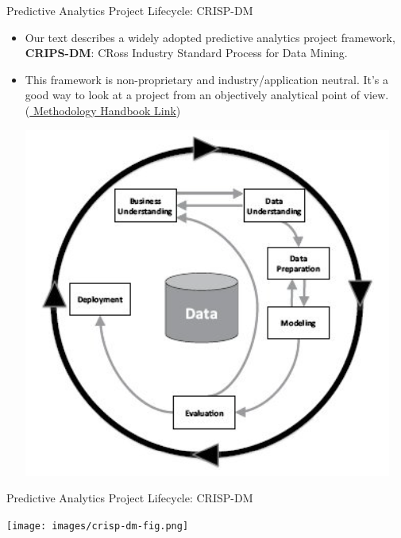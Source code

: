 \documentclass[aspectratio=169,xcolor=dvipsnames]{beamer}
\begin{document}
\begin{frame}{Predictive Analytics Project Lifecycle: CRISP-DM}
\begin{itemize}
\setlength{\itemsep}{.25cm}

\item Our text describes a widely adopted predictive analytics project framework, \textbf{CRIPS-DM}: CRoss Industry Standard Process for Data Mining.

\item This framework is non-proprietary and industry/application neutral. It's a good way to look at a project from an objectively analytical point of view. \\ (\href{https://almirgouvea.github.io/The-Crisp-DM-Methodology/chapters/intro.html}{\color{blue} Methodology Handbook Link})
\begin{center}
\includegraphics[scale=0.3]{images/crisp-dm.png}
\end{center}
\end{itemize}
\end{frame}

\begin{frame}{Predictive Analytics Project Lifecycle: CRISP-DM}
\begin{center}
\texttt{[image: images/crisp-dm-fig.png]}
\end{center}
\end{frame}

\end{document}
